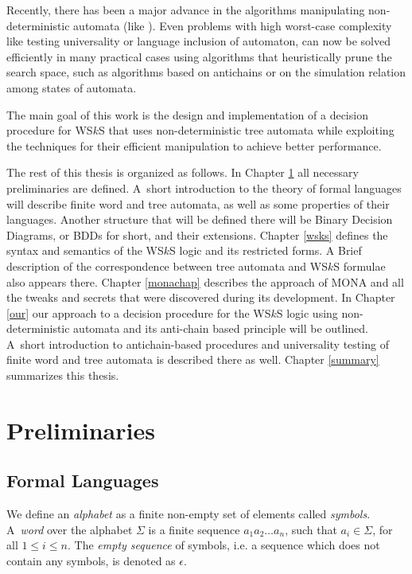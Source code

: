 Recently, there has been a major advance in the algorithms manipulating
non-deter\-mi\-ni\-stic automata (like \cite{vata}). Even problems with high
worst-case complexity like testing universality or language inclusion of
automaton, can now be solved efficiently in many practical cases using
algorithms that heuristically prune the search space, such as algorithms based
on antichains or on the simulation relation among states of automata.

The main goal of this work is the design and implementation of a decision
procedure for WS$k$S that uses non-deterministic tree automata while exploiting
the techniques for their efficient manipulation to achieve better performance.

The rest of this thesis is organized as follows. In Chapter \ref{preli} all
necessary preliminaries are defined. A~short introduction to the theory of
formal languages will describe finite word and tree automata, as well as some
properties of their languages. Another structure that will be defined there will
be Binary Decision Diagrams, or BDDs for short, and their extensions. Chapter
\ref{wsks} defines the syntax and semantics of the WS$k$S logic and its restricted
forms. A Brief description of the correspondence between tree automata and
WS$k$S formulae also appears there.
Chapter \ref{monachap} describes the approach of \textsc{MONA} and all the
tweaks and secrets that were discovered during its development. In Chapter
\ref{our} our approach to  a decision procedure for the WS$k$S logic using
non-deterministic automata and its anti-chain based principle will be outlined.
A~short introduction to antichain-based procedures and universality testing of
finite word and tree automata is described there as well. Chapter \ref{summary}
summarizes this thesis.

\chapter{Preliminaries}\label{preli}

 \section{Formal Languages}

 We define an \emph{alphabet} as a finite non-empty set of elements called
 \emph{symbols}. A~\emph{word} over the alphabet $\Sigma$ is a finite sequence
 $a_1a_2\ldots a_n$, such that $a_i \in \Sigma$, for all $1 \leq i \leq n$. The
 \emph{empty sequence} of symbols, i.e. a sequence  which does not contain any
 symbols, is denoted as $\epsilon$.

